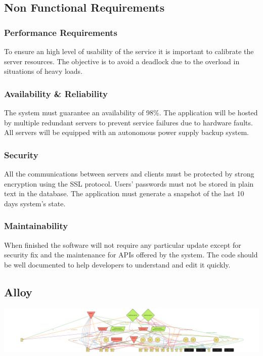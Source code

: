 \documentclass{article}
\begin{document}
			\vspace*{1cm}
		
		\subsection{Non Functional Requirements}
			\subsubsection{Performance Requirements}
			To ensure an high level of usability of the service it is important to calibrate the server resources. The objective is to avoid a deadlock due to the overload in situations of heavy loads.
			\subsubsection{Availability \& Reliability}
			The system must guarantee an availability of 98\%. The application will be hosted by multiple redundant servers to prevent service failures due to hardware faults. All servers will be equipped with an autonomous power supply backup system.
			
			\subsubsection{Security}
			All the communications between servers and clients must be protected by strong encryption using the SSL protocol. Users' passwords must not be stored in plain text in the database. The application must generate a snapshot of the last 10 days system's state.
			
			\subsubsection{Maintainability}
			When finished the software will not require any particular update except for security fix and the maintenance for APIs offered by the system. The code should be well documented to help developers to understand and edit it quickly.
			
		\pagebreak

		\subsection{Alloy}
		
		\pagebreak
		\includegraphics[angle=90,keepaspectratio=true,scale=0.26]{"img/alloy"}
		
\end{document}
